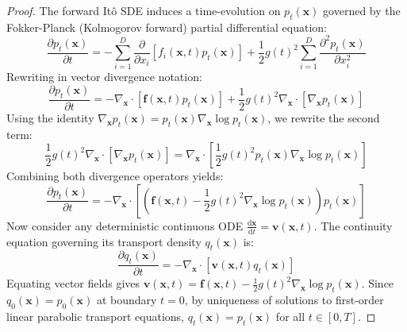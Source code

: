 \documentclass[11pt,a4paper]{article}
\theoremstyle{definition}
\begin{document}
\begin{proof}
The forward It\^o SDE induces a time-evolution on $p_t(\mathbf{x})$ governed by the Fokker-Planck (Kolmogorov forward) partial differential equation:
{\boldmath
\begin{equation}
\frac{\partial p_t(\mathbf{x})}{\partial t} = -\sum_{i=1}^D \frac{\partial}{\partial x_i}\left[ f_i(\mathbf{x}, t) p_t(\mathbf{x}) \right] + \frac{1}{2} g(t)^2 \sum_{i=1}^D \frac{\partial^2 p_t(\mathbf{x})}{\partial x_i^2}
\end{equation}
}
Rewriting in vector divergence notation:
{\boldmath
\begin{equation}
\frac{\partial p_t(\mathbf{x})}{\partial t} = -\nabla_\mathbf{x} \cdot \left[ \mathbf{f}(\mathbf{x}, t) p_t(\mathbf{x}) \right] + \frac{1}{2} g(t)^2 \nabla_\mathbf{x} \cdot \left[ \nabla_\mathbf{x} p_t(\mathbf{x}) \right]
\end{equation}
}
Using the identity $\nabla_\mathbf{x} p_t(\mathbf{x}) = p_t(\mathbf{x}) \nabla_\mathbf{x} \log p_t(\mathbf{x})$, we rewrite the second term:
{\boldmath
\begin{equation}
\frac{1}{2} g(t)^2 \nabla_\mathbf{x} \cdot \left[ \nabla_\mathbf{x} p_t(\mathbf{x}) \right] = \nabla_\mathbf{x} \cdot \left[ \frac{1}{2} g(t)^2 p_t(\mathbf{x}) \nabla_\mathbf{x} \log p_t(\mathbf{x}) \right]
\end{equation}
}
Combining both divergence operators yields:
{\boldmath
\begin{equation}
\frac{\partial p_t(\mathbf{x})}{\partial t} = -\nabla_\mathbf{x} \cdot \left[ \left( \mathbf{f}(\mathbf{x}, t) - \frac{1}{2} g(t)^2 \nabla_\mathbf{x} \log p_t(\mathbf{x}) \right) p_t(\mathbf{x}) \right]
\end{equation}
}
Now consider any deterministic continuous ODE $\frac{\mathrm{d}\mathbf{x}}{\mathrm{d}t} = \mathbf{v}(\mathbf{x}, t)$. The continuity equation governing its transport density $q_t(\mathbf{x})$ is:
{\boldmath
\begin{equation}
\frac{\partial q_t(\mathbf{x})}{\partial t} = -\nabla_\mathbf{x} \cdot \left[ \mathbf{v}(\mathbf{x}, t) q_t(\mathbf{x}) \right]
\end{equation}
}
Equating vector fields gives $\mathbf{v}(\mathbf{x}, t) = \mathbf{f}(\mathbf{x}, t) - \frac{1}{2} g(t)^2 \nabla_\mathbf{x} \log p_t(\mathbf{x})$. Since $q_0(\mathbf{x}) = p_0(\mathbf{x})$ at boundary $t = 0$, by uniqueness of solutions to first-order linear parabolic transport equations, $q_t(\mathbf{x}) = p_t(\mathbf{x})$ for all $t \in [0, T]$.
\end{proof}
\end{document}
